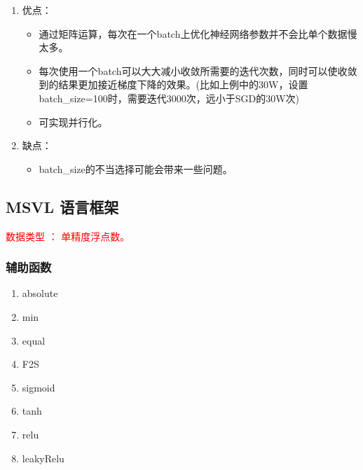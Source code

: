 \begin{enumerate}
  \item 优点：
\begin{itemize}
  \item 通过矩阵运算，每次在一个batch上优化神经网络参数并不会比单个数据慢太多。
  \item 每次使用一个batch可以大大减小收敛所需要的迭代次数，同时可以使收敛到的结果更加接近梯度下降的效果。(比如上例中的30W，设置batch\_size=100时，需要迭代3000次，远小于SGD的30W次)
  \item 可实现并行化。
\end{itemize}
  \item 缺点：
\begin{itemize}
  \item batch\_size的不当选择可能会带来一些问题。

\end{itemize}
\end{enumerate}



\newpage
\subsection{MSVL 语言框架}
\textcolor{red}{数据类型 ： 单精度浮点数。}

\subsubsection{辅助函数}
\begin{enumerate}
  \item absolute
  \item min
  \item equal
  \item F2S
  \item sigmoid
  \item tanh
  \item relu
  \item leakyRelu
\end{enumerate}



